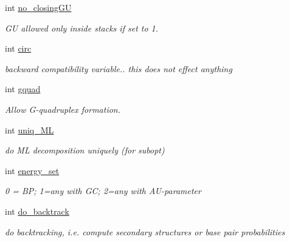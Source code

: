 \begin{DoxyCompactItemize}
\mbox{\label{group__model__details_gaa8d1c7b92489179e1eafa562b7bdd259}} 
int \hyperlink{group__model__details_gaa8d1c7b92489179e1eafa562b7bdd259}{no\+\_\+closing\+GU}
\begin{DoxyCompactList}\small\item\em GU allowed only inside stacks if set to 1. \end{DoxyCompactList}\item 
\mbox{\label{group__model__details_gaf9202a1a09f5828dc731e2d9a10fa111}} 
int \hyperlink{group__model__details_gaf9202a1a09f5828dc731e2d9a10fa111}{circ}
\begin{DoxyCompactList}\small\item\em backward compatibility variable.. this does not effect anything \end{DoxyCompactList}\item 
\mbox{\label{group__model__details_ga25f2bdcdf56e813d288845484a13d704}} 
int \hyperlink{group__model__details_ga25f2bdcdf56e813d288845484a13d704}{gquad}
\begin{DoxyCompactList}\small\item\em Allow G-\/quadruplex formation. \end{DoxyCompactList}\item 
\mbox{\label{group__model__details_ga6c5655c8b272e3e6cab74dd0f540294f}} 
int \hyperlink{group__model__details_ga6c5655c8b272e3e6cab74dd0f540294f}{uniq\+\_\+\+ML}
\begin{DoxyCompactList}\small\item\em do ML decomposition uniquely (for subopt) \end{DoxyCompactList}\item 
int \hyperlink{group__model__details_gafb1ef1166da85092ae8a325e02dcae71}{energy\+\_\+set}
\begin{DoxyCompactList}\small\item\em 0 = BP; 1=any with GC; 2=any with A\+U-\/parameter \end{DoxyCompactList}\item 
int \hyperlink{group__model__details_gad512b5dd4dbec60faccfe137bb474489}{do\+\_\+backtrack}
\begin{DoxyCompactList}\small\item\em do backtracking, i.\+e. compute secondary structures or base pair probabilities \end{DoxyCompactList}\item 

\end{DoxyCompactItemize}
